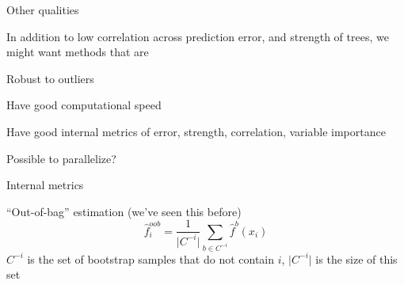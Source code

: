 \documentclass[xcolor={table}, handout]{beamer}
\begin{document}

\begin{frame}{Other qualities}

In addition to low correlation across prediction error, and strength of trees, we might want methods that are\pause
\begin{wideitemize}
\item Robust to outliers\pause
\item Have good computational speed\pause
\item Have good internal metrics of error, strength, correlation, variable importance \pause
\item Possible to parallelize?
\end{wideitemize}

\end{frame}



\begin{frame}{Internal metrics}

``Out-of-bag'' estimation \pause (we've seen this before)\pause
\[
 \hat f_i^{oob} = \frac{1}{\lvert C^{-i} \rvert}\sum_{b \in C^{-i}}\hat f^b (x_i)
\]
$C^{-i}$ is the set of bootstrap samples that do not contain $i$, $\lvert C^{-i} \rvert$ is the size of this set
\end{frame}


\end{document}

